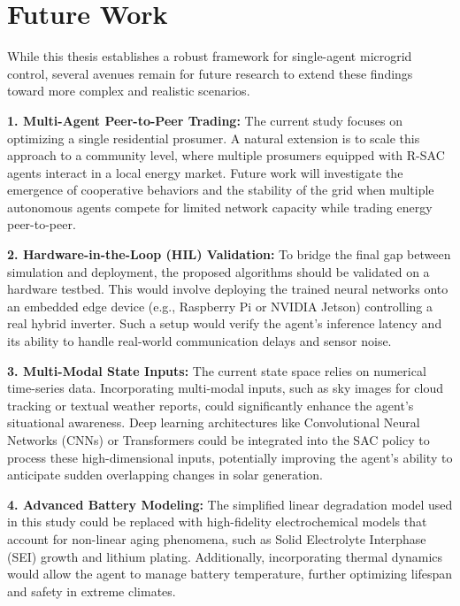 
\section{Future Work}

While this thesis establishes a robust framework for single-agent microgrid control, several avenues remain for future research to extend these findings toward more complex and realistic scenarios.

\textbf{1. Multi-Agent Peer-to-Peer Trading:} The current study focuses on optimizing a single residential prosumer. A natural extension is to scale this approach to a community level, where multiple prosumers equipped with R-SAC agents interact in a local energy market. Future work will investigate the emergence of cooperative behaviors and the stability of the grid when multiple autonomous agents compete for limited network capacity while trading energy peer-to-peer.

\textbf{2. Hardware-in-the-Loop (HIL) Validation:} To bridge the final gap between simulation and deployment, the proposed algorithms should be validated on a hardware testbed. This would involve deploying the trained neural networks onto an embedded edge device (e.g., Raspberry Pi or NVIDIA Jetson) controlling a real hybrid inverter. Such a setup would verify the agent's inference latency and its ability to handle real-world communication delays and sensor noise.

\textbf{3. Multi-Modal State Inputs:} The current state space relies on numerical time-series data. Incorporating multi-modal inputs, such as sky images for cloud tracking or textual weather reports, could significantly enhance the agent's situational awareness. Deep learning architectures like Convolutional Neural Networks (CNNs) or Transformers could be integrated into the SAC policy to process these high-dimensional inputs, potentially improving the agent's ability to anticipate sudden overlapping changes in solar generation.

\textbf{4. Advanced Battery Modeling:} The simplified linear degradation model used in this study could be replaced with high-fidelity electrochemical models that account for non-linear aging phenomena, such as Solid Electrolyte Interphase (SEI) growth and lithium plating. Additionally, incorporating thermal dynamics would allow the agent to manage battery temperature, further optimizing lifespan and safety in extreme climates.
